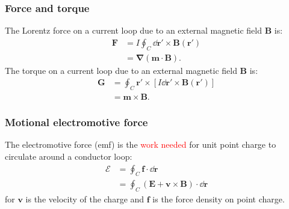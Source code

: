 \documentclass{article}
\newcommand{\vc}[1]{\boldsymbol{#1}}
\begin{document}
\begin{multicols*}{3}
\newcolumn

\subsubsection*{Force and torque}
The Lorentz force on a current loop due to an
external magnetic field $\vc{B}$ is:
\begin{align*}
    \vc{F}
    &=I\oint_C\dd\vc{r}'\times\vc{B}(\vc{r}') \\
    &=\vc{\nabla}(\vc{m}\cdot\vc{B}).
\end{align*}
The torque on a current loop due to an
external magnetic field $\vc{B}$ is:
\begin{align*}
    \vc{G}
    &=\oint_C\vc{r}'\times[I\dd\vc{r}'\times\vc{B}(\vc{r}')] \\
    &=\vc{m}\times\vc{B}.
\end{align*}

\subsubsection*{Motional electromotive force}
The electromotive force (emf) is the \textcolor{red}{work needed} 
for unit point charge to circulate around a conductor loop:
\begin{align*}
    \mathcal{E}
    &=\oint_C\vc{f}\cdot\dd\vc{r} \\
    &=\oint_C(\vc{E}+\vc{v}\times\vc{B})\cdot\dd\vc{r}
\end{align*}
for $\vc{v}$ is the velocity of the charge
and $\vc{f}$ is the force density on point charge.


\end{multicols*}
\end{document}
